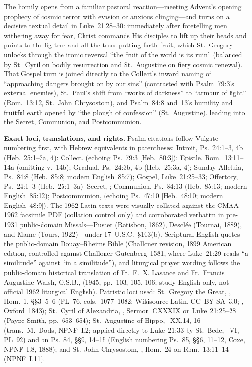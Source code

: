 The homily opens from a familiar pastoral reaction---meeting Advent's opening prophecy of cosmic terror with evasion or anxious clinging---and turns on a decisive textual detail in Luke~21:28--30: immediately after foretelling men withering away for fear, Christ commands His disciples to lift up their heads and points to the fig tree and all the trees putting forth fruit, which St.~Gregory unlocks through the ironic reversal ``the fruit of the world is its ruin'' (balanced by St.~Cyril on bodily resurrection and St.~Augustine on fiery cosmic renewal). That Gospel turn is joined directly to the Collect's inward naming of ``approaching dangers brought on by our sins'' (contrasted with Psalm~79:3's external enemies), St.~Paul's shift from ``works of darkness'' to ``armour of light'' (Rom.~13:12, St.~John Chrysostom), and Psalm~84:8 and~13's humility and fruitful earth opened by ``the plough of confession'' (St.~Augustine), leading into the Secret, Communion, and Postcommunion.

\textbf{Exact loci, translations, and rights.} Psalm citations follow Vulgate numbering first, with Hebrew equivalents in parentheses: Introit, Ps.~24:1--3, 4b (Heb.~25:1--3a, 4); Collect,  (echoing Ps.~79:3 [Heb.~80:3]); Epistle, Rom.~13:11--14a (omitting v.~14b); Gradual, Ps.~24:3b, 4b (Heb.~25:3a, 4); Sunday Alleluia, Ps.~84:8 (Heb.~85:8; modern English~85:7); Gospel, Luke~21:25--33; Offertory, Ps.~24:1--3 (Heb.~25:1--3a); Secret, ; Communion, Ps.~84:13 (Heb.~85:13; modern English~85:12); Postcommunion,  (echoing Ps.~47:10 [Heb.~48:10; modern English~48:9]). The 1962 Latin texts were visually collated against the CMAA 1962 facsimile PDF (collation control only) and corroborated verbatim in pre-1931 public-domain Missals---Pustet (Ratisbon, 1862), Descl\'ee (Tournai, 1889), and Mame (Tours, 1922)---under 17~U.S.C.~\S103(b). Scriptural English quotes the public-domain Douay--Rheims Bible (Challoner revision, 1899 American edition, controlled against Challoner Gutenberg~1581, where Luke~21:29 reads ``a similitude'' against ``in a similitude''), and liturgical prayer wording follows the public-domain historical translation of Fr.~F.~X. Lasance and Fr.~Francis Augustine Walsh, O.S.B.,  (1945, pp.~103, 105, 106; study English only, not official 1962 liturgical English). Patristic loci used: St.~Gregory the Great, , Hom.~1, \S\S3, 5--6 (PL~76, cols.~1077--1082; Wikisource Latin, CC~BY-SA~3.0; , Oxford~1843); St.~Cyril of Alexandria, , Sermon~CXXXIX on Luke~21:25--28 (Payne Smith, pp.~653--654); St.~Augustine of Hippo, ~XX.14, 16 (trans.\ M.~Dods, NPNF~I.2; applied directly to Luke~21:33 by St.~Bede, ~VI, PL~92) and  on Ps.~84, \S\S9, 14--15 (English numbering Ps.~85, \S\S6, 11--12, Coxe, NPNF~I.8, 1888); and St.~John Chrysostom, , Hom.~24 on Rom.~13:11--14 (NPNF~I.11).

